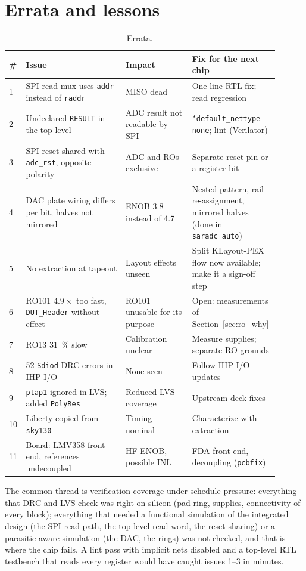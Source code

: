 \documentclass[10pt,a4paper]{article}
\begin{document}
\section{Errata and lessons}
\begin{table}[H]\centering\small
\begin{tabular}{p{0.04\linewidth}p{0.36\linewidth}p{0.24\linewidth}p{0.26\linewidth}}
\toprule
\# & Issue & Impact & Fix for the next chip \\
\midrule
1 & SPI read mux uses \texttt{addr} instead of \texttt{raddr} & MISO dead & One-line RTL fix; read regression \\
2 & Undeclared \texttt{RESULT} in the top level & ADC result not readable by SPI & \texttt{`default\_nettype none}; lint (Verilator) \\
3 & SPI reset shared with \texttt{adc\_rst}, opposite polarity & ADC and ROs exclusive & Separate reset pin or a register bit \\
4 & DAC plate wiring differs per bit, halves not mirrored & ENOB 3.8 instead of 4.7 & Nested pattern, rail re-assignment, mirrored halves (done in \texttt{saradc\_auto}) \\
5 & No extraction at tapeout & Layout effects unseen & Split KLayout-PEX flow now available; make it a sign-off step \\
6 & RO101 $4.9\times$ too fast, \texttt{DUT\_Header} without effect & RO101 unusable for its purpose & Open: measurements of Section~\ref{sec:ro_why} \\
7 & RO13 \SI{31}{\percent} slow & Calibration unclear & Measure supplies; separate RO grounds \\
8 & 52 \texttt{Sdiod} DRC errors in IHP I/O & None seen & Follow IHP I/O updates \\
9 & \texttt{ptap1} ignored in LVS; added \texttt{PolyRes} & Reduced LVS coverage & Upstream deck fixes \\
10 & Liberty copied from \texttt{sky130} & Timing nominal & Characterize with extraction \\
11 & Board: LMV358 front end, references undecoupled & HF ENOB, possible INL & FDA front end, decoupling (\texttt{pcbfix}) \\
\bottomrule
\end{tabular}
\caption{Errata.}
\end{table}
The common thread is verification coverage under schedule pressure: everything that DRC and LVS check
was right on silicon (pad ring, supplies, connectivity of every block); everything that needed a functional
simulation of the integrated design (the SPI read path, the top-level read word, the reset sharing) or a
parasitic-aware simulation (the DAC, the rings) was not checked, and that is where the chip fails. A
lint pass with implicit nets disabled and a top-level RTL testbench that reads every register would have
caught issues 1--3 in minutes.
\end{document}
